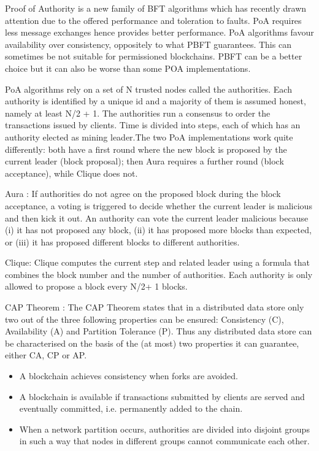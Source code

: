 	      Proof of Authority is a new family of BFT algorithms which has recently drawn attention due to the offered performance and toleration to faults. PoA requires less message exchanges hence provides better performance. PoA algorithms favour availability over consistency, oppositely to what PBFT guarantees. This can sometimes be not suitable for permissioned blockchains. PBFT can be a better choice but it can also be worse than some POA implementations. 
	      
	      PoA algorithms rely on a set of N trusted nodes called the authorities. Each authority is identified by a unique id and a majority of them is assumed honest, namely at least N/2 + 1. The authorities run a consensus to order the transactions issued by clients. Time is divided into steps, each of which has an authority elected as mining leader.The two PoA implementations work quite differently: both have a first round where the new block is proposed by the current leader (block proposal); then Aura requires a further round (block acceptance), while Clique does not.
	      
	      Aura : If authorities do not agree on the proposed block during the block acceptance, a voting is triggered to decide whether the current leader is malicious and then kick it out. An authority can vote the current leader malicious because (i) it has not proposed any block, (ii) it has proposed more blocks than expected, or (iii) it has proposed different blocks to different authorities.
	      
	      Clique: Clique computes the current step and related leader using a formula that combines the block number and the number of authorities. Each authority is only allowed to propose a block every N/2+ 1 blocks. 
	      
	      CAP Theorem : The CAP Theorem states that in a distributed data store only two out of the three following properties can be ensured: Consistency (C), Availability (A) and Partition Tolerance (P). Thus any distributed data store can be characterised on the basis of the (at most) two properties it can guarantee, either CA, CP or AP. 
	      \begin{itemize}
	      	\item A blockchain achieves consistency when forks are avoided.
	      	\item A blockchain is available if transactions submitted by clients are served and eventually     committed, i.e. permanently added to the chain.
	      	\item When a network partition occurs, authorities are divided into disjoint groups in such a way that nodes in different groups cannot communicate each other.
	      \end{itemize}
	      
